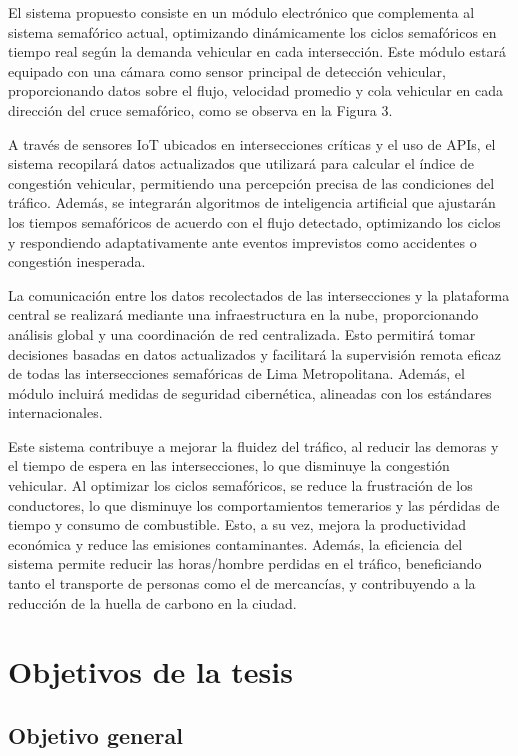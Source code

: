\documentclass[12pt,a4paper,oneside]{report}
\begin{document}
El sistema propuesto consiste en un módulo electrónico que complementa al sistema semafórico actual, optimizando dinámicamente los ciclos semafóricos en tiempo real según la demanda vehicular en cada intersección. Este módulo estará equipado con una cámara como sensor principal de detección vehicular, proporcionando datos sobre el flujo, velocidad promedio y cola vehicular en cada dirección del cruce semafórico, como se observa en la Figura 3.

A través de sensores IoT ubicados en intersecciones críticas y el uso de APIs, el sistema recopilará datos actualizados que utilizará para calcular el índice de congestión vehicular, permitiendo una percepción precisa de las condiciones del tráfico. Además, se integrarán algoritmos de inteligencia artificial que ajustarán los tiempos semafóricos de acuerdo con el flujo detectado, optimizando los ciclos y respondiendo adaptativamente ante eventos imprevistos como accidentes o congestión inesperada.

La comunicación entre los datos recolectados de las intersecciones y la plataforma central se realizará mediante una infraestructura en la nube, proporcionando análisis global y una coordinación de red centralizada. Esto permitirá tomar decisiones basadas en datos actualizados y facilitará la supervisión remota eficaz de todas las intersecciones semafóricas de Lima Metropolitana. Además, el módulo incluirá medidas de seguridad cibernética, alineadas con los estándares internacionales.

Este sistema contribuye a mejorar la fluidez del tráfico, al reducir las demoras y el tiempo de espera en las intersecciones, lo que disminuye la congestión vehicular. Al optimizar los ciclos semafóricos, se reduce la frustración de los conductores, lo que disminuye los comportamientos temerarios y las pérdidas de tiempo y consumo de combustible. Esto, a su vez, mejora la productividad económica y reduce las emisiones contaminantes. Además, la eficiencia del sistema permite reducir las horas/hombre perdidas en el tráfico, beneficiando tanto el transporte de personas como el de mercancías, y contribuyendo a la reducción de la huella de carbono en la ciudad.

\section{Objetivos de la tesis}\label{objetivos-del-proyecto-de-tesis}

\subsection{Objetivo general}\label{objetivo-general}
\end{document}
